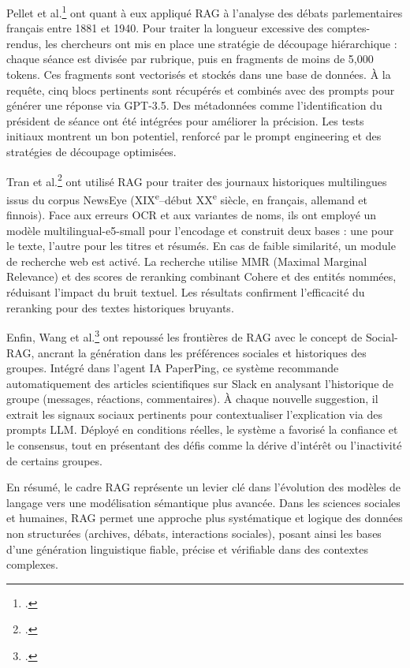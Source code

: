 \documentclass[a4paper,twoside,12pt]{book}
\begin{document}
Pellet et al.\footcite{pellet} ont quant à eux appliqué RAG à l'analyse des débats parlementaires français entre 1881 et 1940. Pour traiter la longueur excessive des comptes-rendus, les chercheurs ont mis en place une stratégie de découpage hiérarchique : chaque séance est divisée par rubrique, puis en fragments de moins de 5,000 tokens. Ces fragments sont vectorisés et stockés dans une base de données. À la requête, cinq blocs pertinents sont récupérés et combinés avec des prompts pour générer une réponse via GPT-3.5. Des métadonnées comme l'identification du président de séance ont été intégrées pour améliorer la précision. Les tests initiaux montrent un bon potentiel, renforcé par le prompt engineering et des stratégies de découpage optimisées.

Tran et al.\footcite{tran2024} ont utilisé RAG pour traiter des journaux historiques multilingues issus du corpus NewsEye (XIX\textsuperscript{e}–début XX\textsuperscript{e} siècle, en français, allemand et finnois). Face aux erreurs OCR et aux variantes de noms, ils ont employé un modèle multilingual-e5-small pour l'encodage et construit deux bases : une pour le texte, l'autre pour les titres et résumés. En cas de faible similarité, un module de recherche web est activé. La recherche utilise MMR (Maximal Marginal Relevance) et des scores de reranking combinant Cohere et des entités nommées, réduisant l'impact du bruit textuel. Les résultats confirment l'efficacité du reranking pour des textes historiques bruyants.

Enfin, Wang et al.\footcite{wang2024} ont repoussé les frontières de RAG avec le concept de Social-RAG, ancrant la génération dans les préférences sociales et historiques des groupes. Intégré dans l'agent IA PaperPing, ce système recommande automatiquement des articles scientifiques sur Slack en analysant l'historique de groupe (messages, réactions, commentaires). À chaque nouvelle suggestion, il extrait les signaux sociaux pertinents pour contextualiser l'explication via des prompts LLM. Déployé en conditions réelles, le système a favorisé la confiance et le consensus, tout en présentant des défis comme la dérive d'intérêt ou l'inactivité de certains groupes.

En résumé, le cadre RAG représente un levier clé dans l'évolution des modèles de langage vers une modélisation sémantique plus avancée. Dans les sciences sociales et humaines, RAG permet une approche plus systématique et logique des données non structurées (archives, débats, interactions sociales), posant ainsi les bases d'une génération linguistique fiable, précise et vérifiable dans des contextes complexes.
\end{document}
